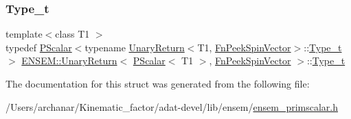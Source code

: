 \subsubsection{\texorpdfstring{Type\_t}{Type\_t}\hspace{0.1cm}{\footnotesize\ttfamily [3/3]}}
{\footnotesize\ttfamily template$<$class T1 $>$ \\
typedef \mbox{\hyperlink{classENSEM_1_1PScalar}{P\+Scalar}}$<$typename \mbox{\hyperlink{structENSEM_1_1UnaryReturn}{Unary\+Return}}$<$T1, \mbox{\hyperlink{structENSEM_1_1FnPeekSpinVector}{Fn\+Peek\+Spin\+Vector}}$>$\+::\mbox{\hyperlink{structENSEM_1_1UnaryReturn_3_01PScalar_3_01T1_01_4_00_01FnPeekSpinVector_01_4_ac623af45f4638d6db8fefb084c447ef0}{Type\+\_\+t}}$>$ \mbox{\hyperlink{structENSEM_1_1UnaryReturn}{E\+N\+S\+E\+M\+::\+Unary\+Return}}$<$ \mbox{\hyperlink{classENSEM_1_1PScalar}{P\+Scalar}}$<$ T1 $>$, \mbox{\hyperlink{structENSEM_1_1FnPeekSpinVector}{Fn\+Peek\+Spin\+Vector}} $>$\+::\mbox{\hyperlink{structENSEM_1_1UnaryReturn_3_01PScalar_3_01T1_01_4_00_01FnPeekSpinVector_01_4_ac623af45f4638d6db8fefb084c447ef0}{Type\+\_\+t}}}



The documentation for this struct was generated from the following file\+:\begin{DoxyCompactItemize}
\item 
/\+Users/archanar/\+Kinematic\+\_\+factor/adat-\/devel/lib/ensem/\mbox{\hyperlink{adat-devel_2lib_2ensem_2ensem__primscalar_8h}{ensem\+\_\+primscalar.\+h}}\end{DoxyCompactItemize}
